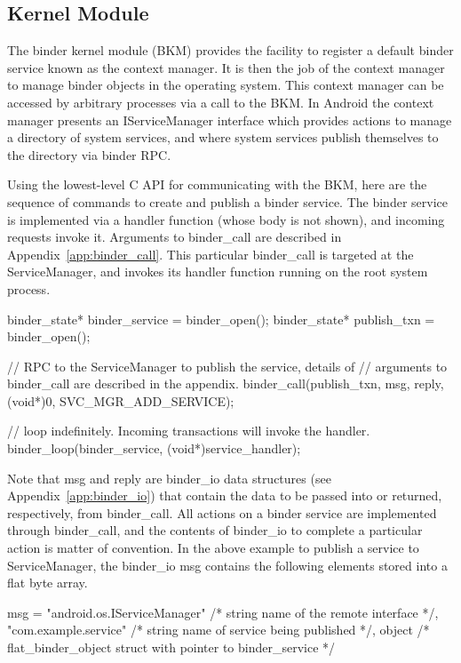 \documentclass[prodmode]{acmlarge}
\begin{document}
\subsection{Kernel Module}
The binder kernel module (BKM) provides the facility to register a default binder service known as the context manager. It is then the job of the context manager to manage binder objects in the operating system. This context manager can be accessed by arbitrary processes via a call to the BKM. In Android the context manager presents an IServiceManager interface which provides actions to manage a directory of system services, and where system services publish themselves to the directory via binder RPC.

Using the lowest-level C API for communicating with the BKM, here are the sequence of commands to create and publish a binder service. The binder service is implemented via a handler function (whose body is not shown), and incoming requests invoke it. Arguments to binder\_call are described in Appendix~\ref{app:binder_call}. This particular binder\_call is targeted at the ServiceManager, and invokes its handler function running on the root system process.

\begin{snippet}[label=snip:binder_call,caption=binder\_call to publish a service with ServiceManager]
binder_state* binder_service = binder_open();
binder_state* publish_txn = binder_open();

// RPC to the ServiceManager to publish the  service, details of
// arguments to binder_call  are described in the appendix.
binder_call(publish_txn, msg, reply, (void*)0, SVC_MGR_ADD_SERVICE);

// loop indefinitely. Incoming transactions  will invoke the handler.
binder_loop(binder_service, (void*)service_handler);
\end{snippet}

Note that msg and reply are binder\_io data structures (see Appendix~\ref{app:binder_io}) that contain the data to be passed into or returned, respectively, from binder\_call. All actions on a binder service are implemented through binder\_call, and the contents of binder\_io to complete a particular action is matter of convention. In the above example to publish a service to ServiceManager, the binder\_io msg contains the following elements stored into a flat byte array.

\begin{snippet}[caption=contents of msg passed into binder\_call]
msg = {
  "android.os.IServiceManager" /* string name of the remote interface */,
  "com.example.service" /* string name of service being published */,
  object /* flat_binder_object struct with pointer to binder_service */
}
\end{snippet}
\end{document}
